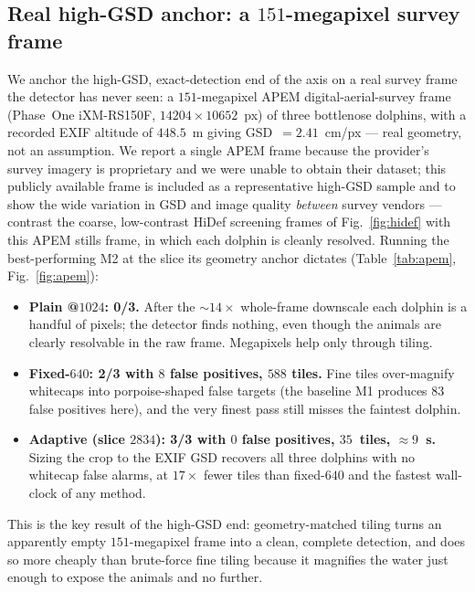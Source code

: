 \documentclass[11pt,a4paper]{article}
\newcommand{\imgsz}{1024}
\begin{document}
\subsection{Real high-GSD anchor: a $151$-megapixel survey frame}\label{sec:apem}
We anchor the high-GSD, exact-detection end of the axis on a real survey frame
the detector has never seen: a $151$-megapixel APEM digital-aerial-survey frame
(Phase~One iXM-RS150F, $14204\times10652$~px) of three bottlenose dolphins, with
a recorded EXIF altitude of $448.5$~m giving GSD~$=2.41$~cm/px --- real geometry,
not an assumption. We report a single APEM frame because the provider's survey
imagery is proprietary and we were unable to obtain their dataset; this
publicly available frame is included as a representative high-GSD sample and to
show the wide variation in GSD and image quality \emph{between} survey vendors
--- contrast the coarse, low-contrast HiDef screening frames of
Fig.~\ref{fig:hidef} with this APEM stills frame, in which each dolphin is
cleanly resolved. Running the best-performing M2 at the slice its geometry anchor
dictates (Table~\ref{tab:apem}, Fig.~\ref{fig:apem}):
\begin{itemize}[itemsep=2pt,topsep=2pt]
  \item \textbf{Plain @$\imgsz$: 0/3.} After the $\sim\!14\times$ whole-frame
  downscale each dolphin is a handful of pixels; the detector finds nothing,
  even though the animals are clearly resolvable in the raw frame. Megapixels
  help only through tiling.
  \item \textbf{Fixed-$640$: 2/3 with $8$ false positives, $588$ tiles.} Fine
  tiles over-magnify whitecaps into porpoise-shaped false targets (the baseline M1
  produces $83$ false positives here), and the very finest pass still misses the
  faintest dolphin.
  \item \textbf{Adaptive (slice $2834$): 3/3 with $0$ false positives,
  $35$~tiles, $\approx\!9$~s.} Sizing the crop to the EXIF GSD recovers all
  three dolphins with no whitecap false alarms, at $17\times$ fewer
  tiles than fixed-$640$ and the fastest wall-clock of any method.
\end{itemize}
This is the key result of the high-GSD end: geometry-matched tiling turns an
apparently empty $151$-megapixel frame into a clean, complete detection, and
does so more cheaply than brute-force fine tiling because it magnifies the water
just enough to expose the animals and no further.
\end{document}
